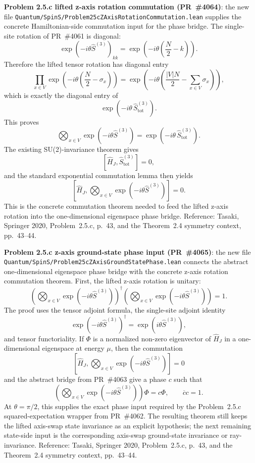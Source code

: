 \documentclass[a4paper,11pt]{article}
\begin{document}
\textbf{Problem 2.5.c lifted z-axis rotation commutation (PR~\#4064)}:
the new file
\texttt{Quantum/SpinS/Problem25cZAxisRotationCommutation.lean} supplies the
concrete Hamiltonian-side commutation input for the phase bridge.  The
single-site rotation of PR~\#4061 is diagonal:
\[
  \exp(-i\theta \hat S^{(3)})_{kk}
    = \exp\!\left(-i\theta\left(\frac N2-k\right)\right).
\]
Therefore the lifted tensor rotation has diagonal entry
\[
  \prod_{x\in V}
  \exp\!\left(-i\theta\left(\frac N2-\sigma_x\right)\right)
  =
  \exp\!\left(-i\theta\left(\frac{|V|N}{2}
    -\sum_{x\in V}\sigma_x\right)\right),
\]
which is exactly the diagonal entry of
\[
  \exp(-i\theta\,\hat S^{(3)}_{\mathrm{tot}}).
\]
This proves
\[
  \bigotimes_{x\in V}\exp(-i\theta \hat S^{(3)})
  =
  \exp(-i\theta\,\hat S^{(3)}_{\mathrm{tot}}).
\]
The existing SU(2)-invariance theorem gives
\[
  [\hat H_J,\hat S^{(3)}_{\mathrm{tot}}]=0,
\]
and the standard exponential commutation lemma then yields
\[
  \left[\hat H_J,
    \bigotimes_{x\in V}\exp(-i\theta \hat S^{(3)})\right]=0.
\]
This is the concrete commutation theorem needed to feed the lifted z-axis
rotation into the one-dimensional eigenspace phase bridge.  Reference:
Tasaki, Springer 2020, Problem~2.5.c, p.~43, and the Theorem~2.4 symmetry
context, pp.~43--44.

\textbf{Problem 2.5.c z-axis ground-state phase input (PR~\#4065)}:
the new file
\texttt{Quantum/SpinS/Problem25cZAxisGroundStatePhase.lean} connects the
abstract one-dimensional eigenspace phase bridge with the concrete z-axis
rotation commutation theorem.  First, the lifted z-axis rotation is unitary:
\[
  \left(\bigotimes_{x\in V}\exp(-i\theta \hat S^{(3)})\right)^\dagger
  \left(\bigotimes_{x\in V}\exp(-i\theta \hat S^{(3)})\right)=1.
\]
The proof uses the tensor adjoint formula, the single-site adjoint identity
\[
  \exp(-i\theta\hat S^{(3)})^\dagger
  = \exp(i\theta\hat S^{(3)}),
\]
and tensor functoriality.  If $\Phi$ is a normalized non-zero eigenvector of
$\hat H_J$ in a one-dimensional eigenspace at energy $\mu$, then the
commutation
\[
  [\hat H_J,\bigotimes_{x\in V}\exp(-i\theta \hat S^{(3)})]=0
\]
and the abstract bridge from PR~\#4063 give a phase $c$ such that
\[
  \left(\bigotimes_{x\in V}\exp(-i\theta \hat S^{(3)})\right)\Phi=c\Phi,
  \qquad \overline c c=1.
\]
At $\theta=\pi/2$, this supplies the exact phase input required by the
Problem~2.5.c squared-expectation wrapper from PR~\#4062.  The resulting
theorem still keeps the lifted axis-swap state invariance as an explicit
hypothesis; the next remaining state-side input is the corresponding
axis-swap ground-state invariance or ray-invariance.  Reference: Tasaki,
Springer 2020, Problem~2.5.c, p.~43, and the Theorem~2.4 symmetry context,
pp.~43--44.
\end{document}
